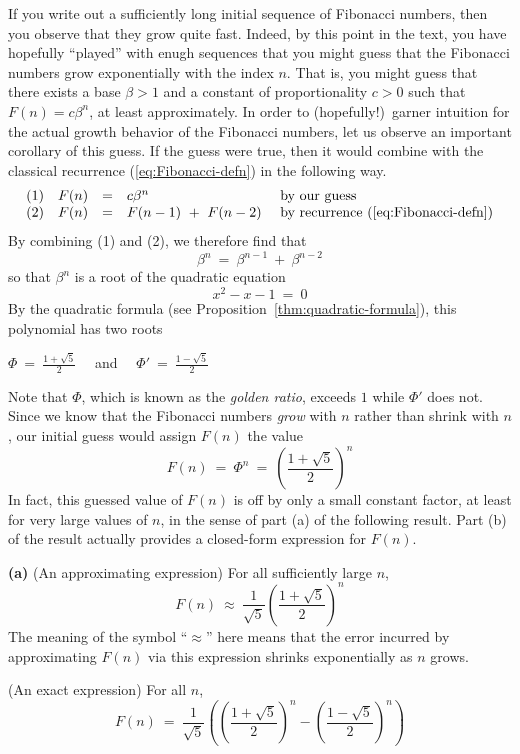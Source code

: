 If you write out a sufficiently long initial sequence of Fibonacci
numbers, then you observe that they grow quite fast.  Indeed, by this
point in the text, you have hopefully ``played'' with enugh sequences
that you might guess that the Fibonacci numbers grow exponentially
with the index $n$.  That is, you might guess that there exists a base
$\beta > 1$ and a constant of proportionality $c > 0$ such that $F(n)
= c \beta^n$, at least approximately.  In order to (hopefully!)~garner
intuition for the actual growth behavior of the Fibonacci numbers, let
us observe an important corollary of this guess.  If the guess were
true, then it would combine with the classical recurrence
(\ref{eq:Fibonacci-defn}) in the following way.
\[ \begin{array}{cccll}
(1) & F(n) & = & c \beta^n
      & \mbox{ by our guess} \\
(2) & F(n) & = & F(n-1) \ + \ F(n-2)
      & \mbox{ by recurrence (\ref{eq:Fibonacci-defn})}
\end{array}
\]
By combining (1) and (2), we therefore find that
\[ \beta^n \ = \ \beta^{n-1} \ + \ \beta^{n-2} \]
so that $\beta^n$ is a root of the quadratic equation
\[
x^2 - x - 1 \ = \ 0
\]
By the quadratic formula (see
Proposition~\ref{thm:quadratic-formula}), this polynomial has two roots 

$\Phi \ = \ {\displaystyle \frac{1+\sqrt{5}}{2}}$ \ \ and \ \
$\Phi' \ = \ {\displaystyle \frac{1-\sqrt{5}}{2}}$

\noindent
Note that $\Phi$, which is known as the \textit{golden ratio},
 exceeds $1$ while $\Phi'$ does not.  Since we
know that the Fibonacci numbers {\em grow} with $n$ rather than shrink
with $n$, our initial guess would assign $F(n)$ the value
\[
F(n) \ = \ \Phi^n \ = \ {\displaystyle \left( \frac{1+\sqrt{5}}{2} \right)^n }
\]
In fact, this guessed value of $F(n)$ is off by only a small constant
factor, at least for very large values of $n$, in the sense of part
(a) of the following result.  Part (b) of the result actually provides
a closed-form expression for $F(n)$.

\begin{prop}
\label{thm:FibNo-GoldenRatio}
{\bf (a)} {\rm (An approximating expression)}
For all sufficiently large $n$,
\[ F(n) \ \approx \
\frac{1}{\sqrt{5}} \left(\frac{1+\sqrt{5}}{2} \right)^n
\]
The meaning of the symbol ``$\approx$'' here means that the error
incurred by approximating $F(n)$ via this expression shrinks
exponentially as $n$ grows.

\medskip

 {\rm (An exact expression)}
For all $n$,
\[ F(n) \ = \ 
\frac{1}{\sqrt{5}} \left( \left(\frac{1+\sqrt{5}}{2} \right)^n -
\left(\frac{1-\sqrt{5}}{2} \right)^n \right)
\]
\end{prop}


